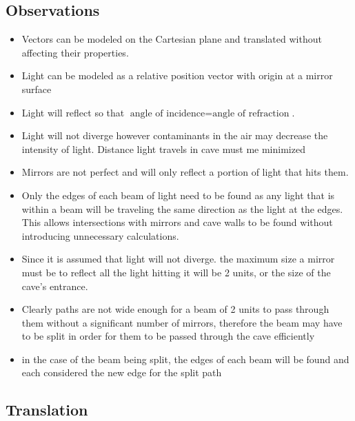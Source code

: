 \documentclass[11pt, letterpaper]{article}
\begin{document}
\subsection{Observations}
\par
\begin{itemize}
\item Vectors can be modeled on the Cartesian plane and translated without affecting their properties. 

\item Light can be modeled as a relative position vector with origin at a mirror surface

\item Light will reflect so that $\textrm{angle  of incidence} = \textrm{angle of refraction}$.

\item Light will not diverge however contaminants in the air may decrease the intensity of light. Distance light travels in cave must me minimized

\item Mirrors are not perfect and will only reflect a portion of light that hits them. 

\item Only the edges of each beam of light need to be found as any light that is within a beam will be traveling the same direction as the light at the edges. This allows intersections with mirrors and cave walls to be found without introducing unnecessary calculations. 

\item  Since it is assumed that light will not diverge. the maximum size a mirror must be to reflect all the light hitting it will be 2 units, or the size of the cave's entrance. 

\item Clearly paths are not wide enough for a beam of 2 units to pass through them without a significant number of mirrors, therefore the beam may have to be split in order for them to be passed through the cave efficiently 

\item in the case of the beam being split, the edges of each beam will be found and each considered the new edge for the split path

\end{itemize}





\subsection{Translation}
\par 
\end{document}

